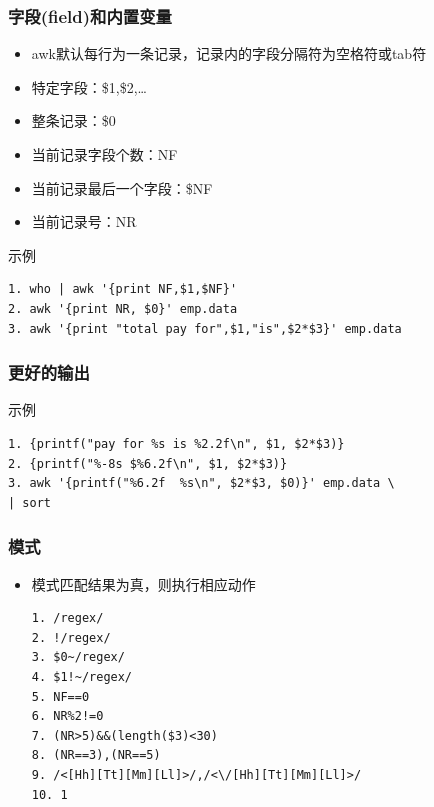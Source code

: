 \documentclass[xcolor=svgnames,presentation]{beamer}
\begin{document}
\begin{frame}[fragile]
\frametitle{字段(field)和内置变量}
\label{sec-2-2-5}
\begin{itemize}

\item awk默认每行为一条记录，记录内的字段分隔符为空格符或tab符
\label{sec-2-2-5-1}%

\item 特定字段：\$1,\$2,\ldots{}
\label{sec-2-2-5-2}%

\item 整条记录：\$0
\label{sec-2-2-5-3}%

\item 当前记录字段个数：NF
\label{sec-2-2-5-4}%

\item 当前记录最后一个字段：\$NF
\label{sec-2-2-5-5}%

\item 当前记录号：NR
\label{sec-2-2-5-6}%
\end{itemize} %
\begin{exampleblock}{示例}
\label{sec-2-2-5-7}


\begin{verbatim}
1. who | awk '{print NF,$1,$NF}'
2. awk '{print NR, $0}' emp.data
3. awk '{print "total pay for",$1,"is",$2*$3}' emp.data
\end{verbatim}
\end{exampleblock}
\end{frame}
\begin{frame}[fragile]
\frametitle{更好的输出}
\label{sec-2-2-6}
\begin{exampleblock}{示例}
\label{sec-2-2-6-1}


\begin{verbatim}
1. {printf("pay for %s is %2.2f\n", $1, $2*$3)}
2. {printf("%-8s $%6.2f\n", $1, $2*$3)}
3. awk '{printf("%6.2f  %s\n", $2*$3, $0)}' emp.data \
| sort
\end{verbatim}
\end{exampleblock}
\end{frame}
\begin{frame}[fragile]
\frametitle{模式}
\label{sec-2-2-7}
\begin{itemize}

\item 模式匹配结果为真，则执行相应动作\\
\label{sec-2-2-7-1}%
\begin{verbatim}
1. /regex/
2. !/regex/
3. $0~/regex/
4. $1!~/regex/
5. NF==0
6. NR%2!=0
7. (NR>5)&&(length($3)<30)
8. (NR==3),(NR==5)
9. /<[Hh][Tt][Mm][Ll]>/,/<\/[Hh][Tt][Mm][Ll]>/
10. 1
\end{verbatim}
\end{itemize} %
\end{frame}
\end{document}
